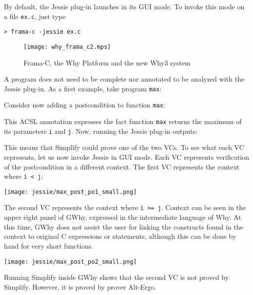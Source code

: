 \documentclass[a4paper,11pt,twoside,openright]{report}
\begin{document}
By default, the Jessie plug-in launches in its GUI mode. To invoke this
mode on a file \verb|ex.c|, just type

\begin{verbatim}
> frama-c -jessie ex.c
\end{verbatim}

\begin{figure}[t]
  \begin{center}
    \texttt{[image: why\_frama\_c2.mps]}
  \end{center}
  \caption{Frama-C, the Why Platform and the new Why3 system}
  \label{fig:platform}
\hrulefill
\end{figure}


A program does not need to be complete nor annotated to be analyzed
with the Jessie plug-in. As a first example, take program \verb|max|:



Consider now adding a postcondition to function \verb|max|:



This ACSL annotation expresses the fact function \verb|max| returns
the maximum of its parameters \verb|i| and \verb|j|. Now, running the
Jessie plug-in outputs:

This means that Simplify could prove one of the two VCs. To see
what each VC represents, let us now invoke Jessie in GUI
mode. Each VC represents verification of the postcondition in a
different context. The first VC represents the context where
\verb|i < j|:

\begin{center}
  \texttt{[image: jessie/max\_post\_po1\_small.png]}
\end{center}

The second VC represents the context where \verb|i >= j|.  Context can
be seen in the upper right panel of GWhy, expressed in the
intermediate language of Why. At this time, GWhy does not assist
the user for linking the constructs found in the context to 
original C expressions or statements, although this can be done
by hand for very short functions.

\begin{center}
  \texttt{[image: jessie/max\_post\_po2\_small.png]}
\end{center}

Running Simplify inside GWhy shows that the second VC is not proved by
Simplify. However, it is proved by prover Alt-Ergo.
\end{document}
